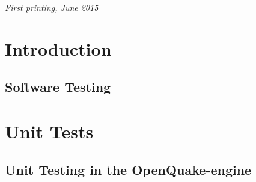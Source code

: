 \documentclass[11pt,fleqn]{book} %
\begin{document}
\noindent \textit{First printing, June 2015} %


\pagestyle{empty} %
\tableofcontents %
\cleardoublepage %
\pagestyle{fancy} %

% 


\part{Introduction}

\chapter{Software Testing}
   \label{chap:intro}
   

\thispagestyle{empty}
\part{Unit Tests}

\chapter{Unit Testing in the OpenQuake-engine}
   \label{chap:unit-tests}
   
   \cleardoublepage
\end{document}
